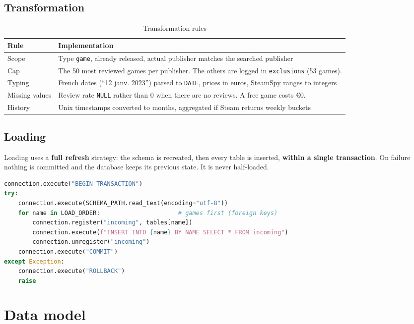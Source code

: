 \documentclass[11pt, a4paper, oneside, headings=normal, numbers=noenddot, DIV=12]{scrartcl}
\begin{document}
\subsection{Transformation}
\begin{table}[H]
\centering\small
\begin{tabularx}{\linewidth}{@{}L{3.4cm} Y@{}}
\toprule
\textbf{Rule} & \textbf{Implementation} \\
\midrule
Scope & Type \texttt{game}, already released, actual publisher matches the searched publisher \\
Cap & The 50 most reviewed games per publisher. The others are logged in \texttt{exclusions} (53 games). \\
Typing & French dates (``12 janv. 2023'') parsed to \texttt{DATE}, prices in euros, SteamSpy ranges to integers \\
Missing values & Review rate \texttt{NULL} rather than 0 when there are no reviews. A free game costs €0. \\
History & Unix timestamps converted to months, aggregated if Steam returns weekly buckets \\
\bottomrule
\end{tabularx}
\caption{Transformation rules}
\end{table}

\subsection{Loading}
Loading uses a \textbf{full refresh} strategy: the schema is recreated, then every table is inserted, \textbf{within a single
transaction}. On failure nothing is committed and the database keeps its previous state. It is never half-loaded.

\begin{lstlisting}[language=Python]
connection.execute("BEGIN TRANSACTION")
try:
    connection.execute(SCHEMA_PATH.read_text(encoding="utf-8"))
    for name in LOAD_ORDER:                      # games first (foreign keys)
        connection.register("incoming", tables[name])
        connection.execute(f"INSERT INTO {name} BY NAME SELECT * FROM incoming")
        connection.unregister("incoming")
    connection.execute("COMMIT")
except Exception:
    connection.execute("ROLLBACK")
    raise
\end{lstlisting}

\section{Data model}
\end{document}
